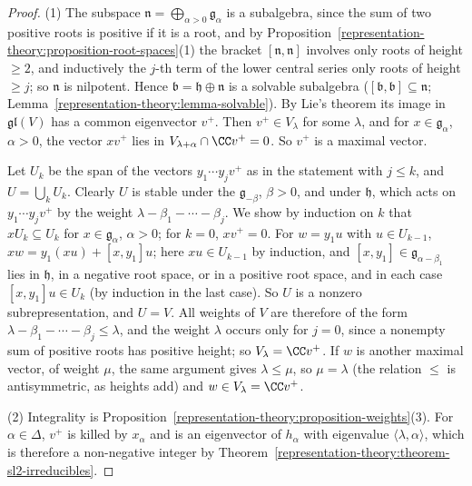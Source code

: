 \begin{proof}
(1) The subspace $\mathfrak{n} = \bigoplus_{\alpha > 0}\mathfrak{g}_\alpha$ is a subalgebra, since the sum of two positive roots is positive if it is a root, and by
Proposition~\ref{representation-theory:proposition-root-spaces}(1) the bracket $[\mathfrak{n}, \mathfrak{n}]$ involves only roots of height $\geq 2$, and inductively the $j$-th term of the
lower central series only roots of height $\geq j$; so $\mathfrak{n}$ is nilpotent. Hence $\mathfrak{b} = \mathfrak{h} \oplus \mathfrak{n}$ is a solvable subalgebra ($[\mathfrak{b},
\mathfrak{b}] \subseteq \mathfrak{n}$; Lemma~\ref{representation-theory:lemma-solvable}). By Lie's theorem its image in $\mathfrak{gl}(V)$ has a common eigenvector $v^+$. Then
$v^+ \in V_\lambda$ for some $\lambda$, and for $x \in \mathfrak{g}_\alpha$, $\alpha > 0$, the vector $xv^+$ lies in $V_{\lambda + \alpha} \cap \CC v^+ = 0$. So $v^+$ is a maximal vector.

Let $U_k$ be the span of the vectors $y_1\cdots y_jv^+$ as in the statement with $j \leq k$, and $U = \bigcup_kU_k$. Clearly $U$ is stable under the $\mathfrak{g}_{-\beta}$, $\beta > 0$, and
under $\mathfrak{h}$, which acts on $y_1\cdots y_jv^+$ by the weight $\lambda - \beta_1 - \cdots - \beta_j$. We show by induction on $k$ that $xU_k \subseteq U_k$ for
$x \in \mathfrak{g}_\alpha$, $\alpha > 0$; for $k = 0$, $xv^+ = 0$. For $w = y_1u$ with $u \in U_{k-1}$, $xw = y_1(xu) + [x, y_1]u$; here $xu \in U_{k-1}$ by induction, and
$[x, y_1] \in \mathfrak{g}_{\alpha - \beta_1}$ lies in $\mathfrak{h}$, in a negative root space, or in a positive root space, and in each case $[x, y_1]u \in U_k$ (by induction in
the last case). So $U$ is a nonzero subrepresentation, and $U = V$. All weights of $V$ are therefore of the form $\lambda - \beta_1 - \cdots - \beta_j \leq \lambda$, and the weight
$\lambda$ occurs only for $j = 0$, since a nonempty sum of positive roots has positive height; so $V_\lambda = \CC v^+$. If $w$ is another maximal vector, of weight $\mu$, the same
argument gives $\lambda \leq \mu$, so $\mu = \lambda$ (the relation $\leq$ is antisymmetric, as heights add) and $w \in V_\lambda = \CC v^+$.

(2) Integrality is Proposition~\ref{representation-theory:proposition-weights}(3). For $\alpha \in \Delta$, $v^+$ is killed by $x_\alpha$ and is an eigenvector of $h_\alpha$ with
eigenvalue $\langle\lambda, \alpha\rangle$, which is therefore a non-negative integer by Theorem~\ref{representation-theory:theorem-sl2-irreducibles}.


\end{proof}
